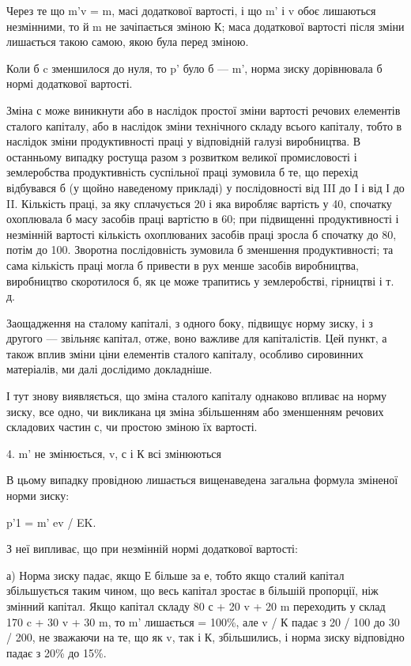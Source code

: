 Через те що  m'v = m, масі додаткової вартості, і що m' і v
обоє лишаються незмінними, то й m не зачіпається зміною К;
маса додаткової вартості після зміни лишається такою самою,
якою була перед зміною.

Коли б c зменшилося до нуля, то p' було б — m', норма зиску
дорівнювала б нормі додаткової вартості.

Зміна с може виникнути або в наслідок простої зміни вартості
речових елементів сталого капіталу, або в наслідок зміни технічного
складу всього капіталу, тобто в наслідок зміни продуктивності
праці у відповідній галузі виробництва. В останньому
випадку ростуща разом з розвитком великої промисловості і
землеробства продуктивність суспільної праці зумовила б те, що
перехід відбувався б (у щойно наведеному прикладі) у послідовності
від III до І і від І до II. Кількість праці, за яку сплачується
20 і яка виробляє вартість у 40, спочатку охоплювала б масу засобів
праці вартістю в 60; при підвищенні продуктивності і незмінній
вартості кількість охоплюваних засобів праці зросла б спочатку
до 80, потім до 100. Зворотна послідовність зумовила б
зменшення продуктивності; та сама кількість праці могла б привести
в рух менше засобів виробництва, виробництво скоротилося
б, як це може трапитись у землеробстві, гірництві і т. д.

Заощадження на сталому капіталі, з одного боку, підвищує
норму зиску, і з другого — звільняє капітал, отже, воно важливе
для капіталістів. Цей пункт, а також вплив зміни ціни елементів
сталого капіталу, особливо сировинних матеріалів, ми далі дослідимо
докладніше.

І тут знову виявляється, що зміна сталого капіталу однаково
впливає на норму зиску, все одно, чи викликана ця зміна збільшенням
або зменшенням речових складових частин с, чи простою
зміною їх вартості.

4. m' не змінюється, v, с і К всі змінюються

В цьому випадку провідною лишається вищенаведена загальна
формула зміненої норми зиску:

p'1 = m' ev / EK.

З неї випливає, що при незмінній нормі додаткової вартості:

а) Норма зиску падає, якщо Е більше за е, тобто якщо сталий
капітал збільшується таким чином, що весь капітал зростає
в більшій пропорції, ніж змінний капітал. Якщо капітал складу
80 с + 20 v + 20 m переходить у склад 170 c + 30 v + 30 m, то m'
лишається = 100\%, але v / К падає з 20 / 100 до 30 / 200, не зважаючи на те,
що як v, так і К, збільшились, і норма зиску відповідно падає з
20\% до 15\%.
